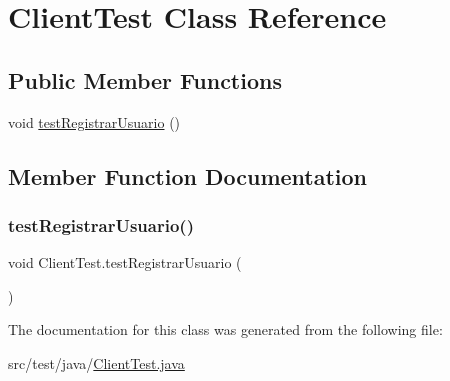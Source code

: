 \hypertarget{class_client_test}{}\section{Client\+Test Class Reference}
\label{class_client_test}
\subsection*{Public Member Functions}
\begin{DoxyCompactItemize}
\item 
void \mbox{\hyperlink{class_client_test_a3ce212ac9c94011a253bb116f4237513}{test\+Registrar\+Usuario}} ()
\end{DoxyCompactItemize}


\subsection{Member Function Documentation}
\mbox{\label{class_client_test_a3ce212ac9c94011a253bb116f4237513}} 
\subsubsection{\texorpdfstring{testRegistrarUsuario()}{testRegistrarUsuario()}}
{\footnotesize\ttfamily void Client\+Test.\+test\+Registrar\+Usuario (\begin{DoxyParamCaption}{ }\end{DoxyParamCaption})}



The documentation for this class was generated from the following file\+:\begin{DoxyCompactItemize}
\item 
src/test/java/\mbox{\hyperlink{_client_test_8java}{Client\+Test.\+java}}\end{DoxyCompactItemize}
